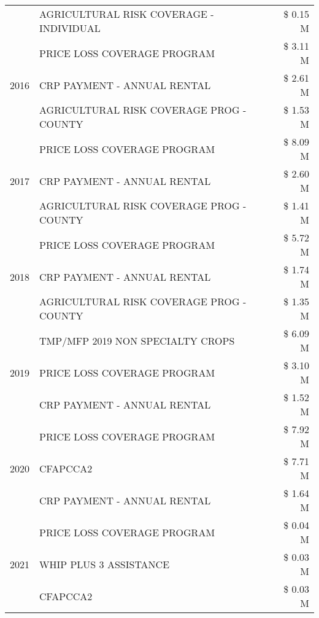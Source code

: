 \begin{tabular}{llr}
 & AGRICULTURAL RISK COVERAGE - INDIVIDUAL & \$ 0.15 M \\
\cline{1-3}
\multirow[t]{3}{*}{2016} & PRICE LOSS COVERAGE PROGRAM & \$ 3.11 M \\
 & CRP PAYMENT - ANNUAL RENTAL & \$ 2.61 M \\
 & AGRICULTURAL RISK COVERAGE PROG - COUNTY & \$ 1.53 M \\
\cline{1-3}
\multirow[t]{3}{*}{2017} & PRICE LOSS COVERAGE PROGRAM & \$ 8.09 M \\
 & CRP PAYMENT - ANNUAL RENTAL & \$ 2.60 M \\
 & AGRICULTURAL RISK COVERAGE PROG - COUNTY & \$ 1.41 M \\
\cline{1-3}
\multirow[t]{3}{*}{2018} & PRICE LOSS COVERAGE PROGRAM & \$ 5.72 M \\
 & CRP PAYMENT - ANNUAL RENTAL & \$ 1.74 M \\
 & AGRICULTURAL RISK COVERAGE PROG - COUNTY & \$ 1.35 M \\
\cline{1-3}
\multirow[t]{3}{*}{2019} & TMP/MFP 2019 NON SPECIALTY CROPS & \$ 6.09 M \\
 & PRICE LOSS COVERAGE PROGRAM & \$ 3.10 M \\
 & CRP PAYMENT - ANNUAL RENTAL & \$ 1.52 M \\
\cline{1-3}
\multirow[t]{3}{*}{2020} & PRICE LOSS COVERAGE PROGRAM & \$ 7.92 M \\
 & CFAPCCA2 & \$ 7.71 M \\
 & CRP PAYMENT - ANNUAL RENTAL & \$ 1.64 M \\
\cline{1-3}
\multirow[t]{3}{*}{2021} & PRICE LOSS COVERAGE PROGRAM & \$ 0.04 M \\
 & WHIP PLUS 3 ASSISTANCE & \$ 0.03 M \\
 & CFAPCCA2 & \$ 0.03 M \\
\cline{1-3}
\bottomrule
\end{tabular}

